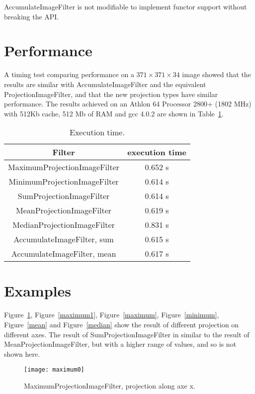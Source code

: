 \documentclass{InsightArticle}
\begin{document}
AccumulateImageFilter is not modifiable to implement functor support without
breaking the API.

\section{Performance}

A timing test comparing performance on a $371 \times 371 \times 34$
image showed that the results are similar with AccumulateImageFilter
and the equivalent ProjectionImageFilter, and that the new projection
types have similar performance. The results achieved on an Athlon 64 
Processor 2800+ (1802 MHz) with 512Kb cache, 512 Mb of RAM and gcc
4.0.2 are shown in Table~\ref{perf}.

\begin{table}[htbp]
\centering
\begin{tabular}{cc}
\hline
Filter & execution time \\
\hline
\hline
MaximumProjectionImageFilter & 0.652 s \\
MinimumProjectionImageFilter  & 0.614 s\\
SumProjectionImageFilter  & 0.614 s\\
MeanProjectionImageFilter  & 0.619 s\\
MedianProjectionImageFilter  & 0.831 s\\
AccumulateImageFilter, sum  & 0.615 s\\
AccumulateImageFilter, mean  & 0.617 s\\
\hline
\end{tabular}
\caption{Execution time.\label{perf}}
\end{table}

\section{Examples}
Figure~\ref{maximum0}, Figure~\ref{maximum1}, Figure~\ref{maximum}, Figure~\ref{minimum}, Figure~\ref{mean} and Figure~\ref{median} show the result of different projection on different axes. The result of SumProjectionImageFilter in similar to the result of MeanProjectionImageFilter, but with a higher range of values, and so is not shown here.

\begin{figure}[htbp]
\centering
\texttt{[image: maximum0]}
\caption{MaximumProjectionImageFilter, projection along axe x.\label{maximum0}}
\end{figure}
\end{document}
